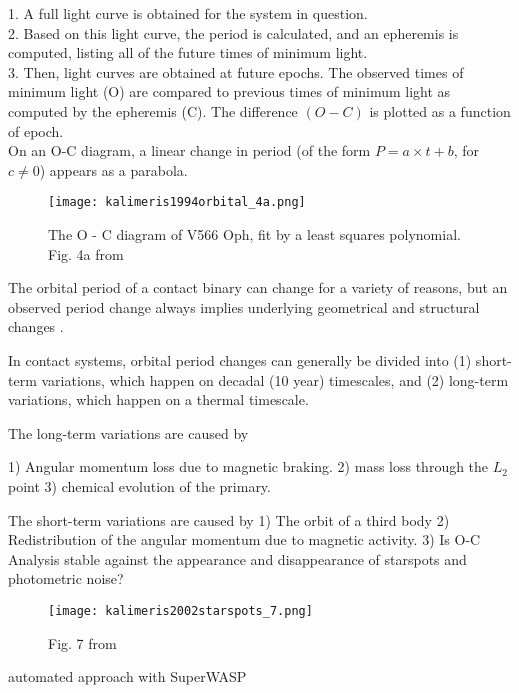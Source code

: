 \documentclass[12pt]{article} %
\numberwithin{equation}{section} %
\begin{document}
1. A full light curve is obtained for the system in question. \\
2. Based on this light curve, the period is calculated, and an epheremis is computed, listing all of the future times of minimum light. \\
3. Then, light curves are obtained at future epochs. The observed times of minimum light (O) are compared to previous times of minimum light as computed by the epheremis (C). The difference $(O-C)$ is plotted as a function of epoch. \\

On an O-C diagram, a linear change in period (of the form $P = a \times t + b$, for $c \neq 0$) appears as a parabola.

\begin{figure}[H]
\centering
\texttt{[image: kalimeris1994orbital\_4a.png]}
\caption{ The O - C diagram of V566 Oph, fit by a least squares polynomial. Fig. 4a from \citet{kalimeris1994orbital}}
\label{fig: kalimeris1994orbital_4a}
\end{figure}

The orbital period of a contact binary can change for a variety of reasons, but an observed period change always implies underlying geometrical and structural changes \citep{kalimeris1994orbital}.

In contact systems, orbital period changes can generally be divided into (1) short-term variations, which happen on decadal (10 year) timescales, and (2) long-term variations, which happen on a thermal timescale.

The long-term variations are caused by

1) Angular momentum loss due to magnetic braking.
2) mass loss through the $L_{2}$ point 
3) chemical evolution of the primary.

The short-term variations are caused by
1) The orbit of a third body
2) Redistribution of the angular momentum due to magnetic activity.
3) 
Is O-C Analysis stable against the appearance and disappearance of starspots and photometric noise? \citep{kalimeris2002starspots}

\begin{figure}[H]
\centering
\texttt{[image: kalimeris2002starspots\_7.png]}
\caption{ Fig. 7 from \citet{kalimeris2002starspots}}
\label{fig: kalimeris2002starspots_7}
\end{figure}

automated approach with SuperWASP \citep{lohr2015orbital}
\end{document}
